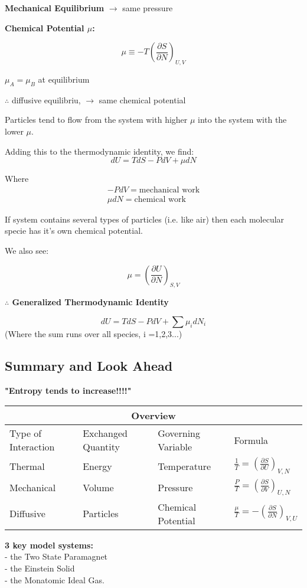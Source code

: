 \textbf{Mechanical Equilibrium} $\rightarrow$ same pressure

\textbf{Chemical Potential $\mu$:}

\begin{equation}
    \mu \equiv -T \left(\frac{\partial S}{\partial N}\right)_{U,V}
\end{equation}

$\mu_A = \mu_B$ at equilibrium

$\therefore$ diffusive equilibriu, $\rightarrow$ same chemical potential

Particles tend to flow from the system with higher $\mu$ into the system with the lower $\mu$.

Adding this to the thermodynamic identity, we find:
\begin{equation}
  dU = TdS - PdV + \mu dN  
\end{equation}

Where
\begin{equation*}
\begin{split}
-PdV = \text{mechanical work}\\
\mu dN = \text{chemical work}
\end{split}
\end{equation*}

\begin{note}
If system contains several types of particles (i.e. like air) then each molecular specie has it's own chemical potential.

We also see:
\end{note}
\[ \mu = \left(\frac{\partial U}{\partial N}\right)_{S,V}\]

\textbf{$\therefore$ Generalized Thermodynamic Identity}

\begin{equation}
    dU = TdS - PdV + \sum \mu_i dN_i
\end{equation}
(Where the sum runs over all species, i =1,2,3...)

\subsection{Summary and Look Ahead}

\textbf{"Entropy tends to increase!!!!"}

\begin{tabular}{ |p{3.5cm}|p{3.5cm}|p{3.5cm}|p{3cm}|  }
 \hline
 \multicolumn{4}{|c|}{Overview} \\
 \hline
 Type of Interaction & Exchanged Quantity & Governing Variable & Formula\\
 \hline
 Thermal   & Energy    & Temperature &   $\frac{1}{T} = \left(\frac{\partial S}{\partial U}\right)_{V,N} $\\
 Mechanical &   Volume  & Pressure   & $\frac{P}{T} = \left(\frac{\partial S}{\partial V}\right)_{U,N} $\\
 Diffusive & Particles & Chemical Potential & $\frac{\mu}{T} = -\left(\frac{\partial S}{\partial N}\right)_{V,U} $\\
 \hline
\end{tabular}

\textbf{3 key model systems:}\\ - the Two State Paramagnet\\ - the Einstein Solid\\ - the Monatomic Ideal Gas.
